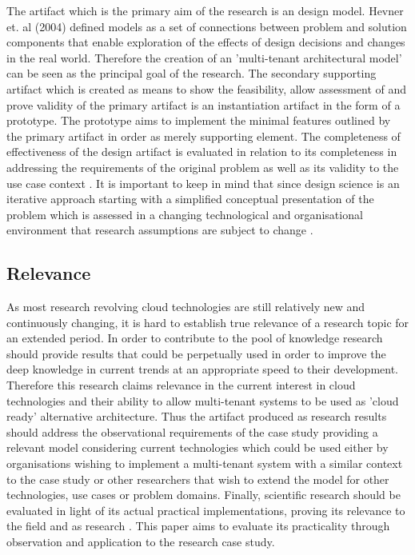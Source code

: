 The artifact which is the primary aim of the research is an design model. Hevner et. al (2004) defined models as a set of connections between problem and solution components that enable exploration of the effects of design decisions and changes in the real world. Therefore the creation of an 'multi-tenant architectural model' can be seen as the principal goal of the research.  The secondary supporting artifact which is created as means to show the feasibility, allow assessment of and prove validity of the primary artifact is an instantiation artifact \cite{Hevner2004a} in the form of a prototype. The prototype aims to implement the minimal features outlined by the primary artifact in order as merely supporting element. The completeness of effectiveness of the design artifact is evaluated in relation to its completeness in addressing the requirements of the original problem as well as its validity to the use case context \cite{Hevner2004a}. It is important to keep in mind that since design science is an iterative approach starting with a simplified conceptual presentation of the problem which is assessed in a changing technological and organisational environment that research assumptions are subject to change \cite{Johansson2000}.

\subsection{Relevance}
As most research revolving cloud technologies are still relatively new and continuously changing, it is hard to establish true relevance of a research topic for an extended period. In order to contribute to the pool of knowledge research should provide results that could be perpetually used in order to improve the deep knowledge in current trends at an appropriate speed to their development. Therefore this research claims relevance in the current interest in cloud technologies and their ability to allow multi-tenant systems to be used as 'cloud ready' alternative architecture. Thus the artifact produced as research results should address the observational requirements of the case study providing a relevant model considering current technologies which could be used either by organisations wishing to implement a multi-tenant system with a similar context to the case study or other researchers that wish to extend the model for other technologies, use cases or problem domains. Finally, scientific research should be evaluated in light of its actual practical implementations, proving its relevance to the field and as research  \cite{Hevner2004a}. This paper aims to evaluate its practicality through observation and application to the research case study.

